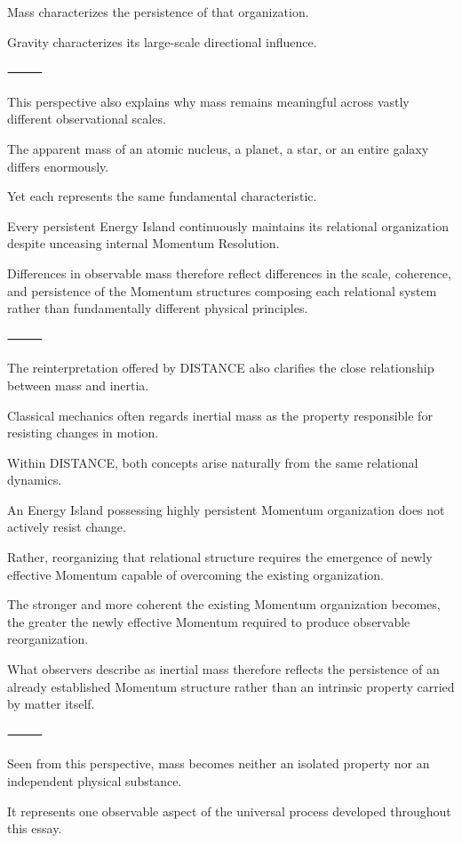 Mass characterizes the persistence of that organization.

Gravity characterizes its large-scale directional influence.

⸻

This perspective also explains why mass remains meaningful across vastly different observational scales.

The apparent mass of an atomic nucleus, a planet, a star, or an entire galaxy differs enormously.

Yet each represents the same fundamental characteristic.

Every persistent Energy Island continuously maintains its relational organization despite unceasing internal Momentum Resolution.

Differences in observable mass therefore reflect differences in the scale, coherence, and persistence of the Momentum structures composing each relational system rather than fundamentally different physical principles.

⸻

The reinterpretation offered by DISTANCE also clarifies the close relationship between mass and inertia.

Classical mechanics often regards inertial mass as the property responsible for resisting changes in motion.

Within DISTANCE, both concepts arise naturally from the same relational dynamics.

An Energy Island possessing highly persistent Momentum organization does not actively resist change.

Rather, reorganizing that relational structure requires the emergence of newly effective Momentum capable of overcoming the existing organization.

The stronger and more coherent the existing Momentum organization becomes, the greater the newly effective Momentum required to produce observable reorganization.

What observers describe as inertial mass therefore reflects the persistence of an already established Momentum structure rather than an intrinsic property carried by matter itself.

⸻

Seen from this perspective, mass becomes neither an isolated property nor an independent physical substance.

It represents one observable aspect of the universal process developed throughout this essay.

